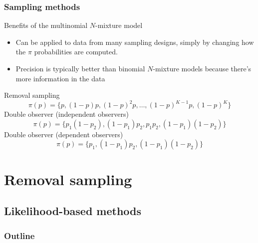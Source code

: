 \documentclass[color=usenames,dvipsnames]{beamer}\usepackage[]{graphicx}\usepackage[]{xcolor}
\begin{document}
\begin{frame}
  \frametitle{Sampling methods}
  Benefits of the multinomial $N$-mixture model
  \begin{itemize}
    \item Can be applied to data from many sampling designs, simply by
      changing how the $\pi$ probabilities are computed. %
    \item Precision is typically better than binomial $N$-mixture
      models because there's more information in the data
  \end{itemize}
  \pause
  \vfill
  Removal sampling %
  \[
    {\pi(p)} = \{p, (1-p)p, (1-p)^2p, \dots, (1-p)^{K-1}p, (1-p)^K\}
  \]
  \pause %
  Double observer (\alert{independent observers})
  \[
    {\pi(p)} = \{p_1(1-p_2), (1-p_1)p_2, p_1p_2, (1-p_1)(1-p_2)\}
  \]
  \pause %
  Double observer (\alert{dependent observers})
  \[
    {\pi(p)} = \{p_1, (1-p_1)p_2, (1-p_1)(1-p_2)\}
  \]
\end{frame}





\section{Removal sampling}

\subsection{Likelihood-based methods}

\begin{frame}
  \frametitle{Outline}
  \Large
  \tableofcontents[currentsection]
\end{frame}
\end{document}
